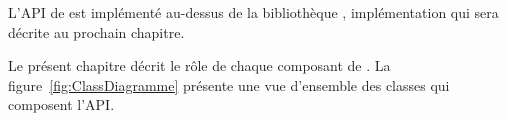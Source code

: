 
L'{API} de \PpFf{} est impl\'ement\'e au-dessus de la biblioth\`eque , impl\'ementation qui sera d\'ecrite au prochain chapitre.

Le pr\'esent chapitre d\'ecrit le r\^ole de chaque composant de
\PpFf{}. La figure~\ref{fig:ClassDiagramme} pr\'esente une vue
d'ensemble des classes qui composent l'{API}.


%
%
%
%


%

